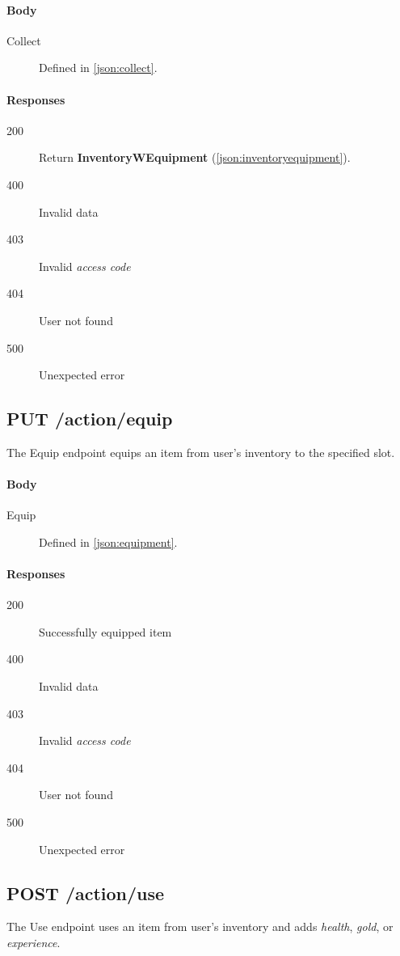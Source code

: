 		\paragraph*{Body}
			\begin{description}
				\item[Collect] Defined in \ref{json:collect}.
			\end{description}
		\paragraph*{Responses}
			\begin{description}		
				\item[200] Return \textbf{InventoryWEquipment} (\ref{json:inventoryequipment}).
				\item[400] Invalid data
				\item[403] Invalid \textit{access code}
				\item[404] User not found
				\item[500] Unexpected error
			\end{description}
	
	\subsection{PUT /action/equip}
	The Equip endpoint equips an item from user's inventory to the specified slot.
		\paragraph*{Body}
			\begin{description}
				\item[Equip] Defined in \ref{json:equipment}.
			\end{description}
		\paragraph*{Responses}
			\begin{description}		
				\item[200] Successfully equipped item
				\item[400] Invalid data
				\item[403] Invalid \textit{access code}
				\item[404] User not found
				\item[500] Unexpected error
			\end{description}
	
	\subsection{POST /action/use}
	The Use endpoint uses an item from user's inventory and adds \textit{health}, \textit{gold}, or \textit{experience}.
